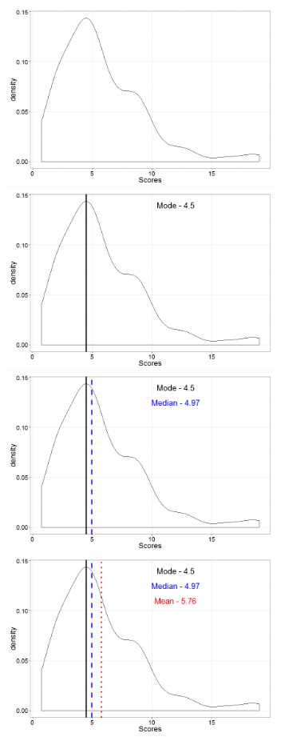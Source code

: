 \documentclass[12pt]{article}
\begin{document}
\includegraphics[width=3.5in]{figure/chisq-1.png}
\includegraphics[width=3.5in]{figure/chisqmode-1.png} \\
\includegraphics[width=3.5in]{figure/chisqmed-1.png}
\includegraphics[width=3.5in]{figure/chisqmean-1.png}
\end{document}
